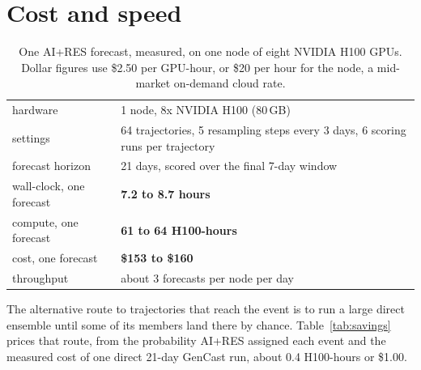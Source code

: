 \documentclass[11pt]{article}
\begin{document}
\section{Cost and speed}
\label{sec:cost}

\begin{table}[h]
\centering\small\setlength{\tabcolsep}{7pt}
\caption{One AI+RES forecast, measured, on one node of eight NVIDIA H100 GPUs. Dollar figures use
\$2.50 per GPU-hour, or \$20 per hour for the node, a mid-market on-demand cloud rate.}
\label{tab:cost}
\begin{tabular}{@{}ll@{}}
\toprule
hardware                 & 1 node, 8x NVIDIA H100 (80\,GB) \\
settings                 & 64 trajectories, 5 resampling steps every 3 days, 6 scoring runs per trajectory \\
forecast horizon         & 21 days, scored over the final 7-day window \\
wall-clock, one forecast & \textbf{7.2 to 8.7 hours} \\
compute, one forecast    & \textbf{61 to 64 H100-hours} \\
cost, one forecast       & \textbf{\$153 to \$160} \\
throughput               & about 3 forecasts per node per day \\
\bottomrule
\end{tabular}
\end{table}

The alternative route to trajectories that reach the event is to run a large direct ensemble until
some of its members land there by chance. Table~\ref{tab:savings} prices that route, from the
probability AI+RES assigned each event and the measured cost of one direct 21-day GenCast run,
about 0.4 H100-hours or \$1.00.
\end{document}
